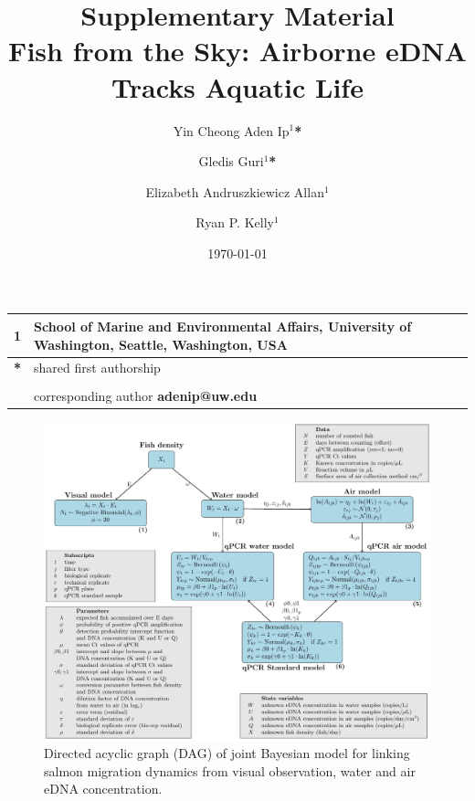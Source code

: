 \documentclass{article}
\title{Supplementary Material \\ \large{Fish from the Sky: Airborne eDNA Tracks Aquatic Life}}
\author{Yin Cheong Aden Ip$^1$\textbf{*} \and
Gledis Guri$^1$\textbf{*} \and
Elizabeth Andruszkiewicz Allan$^1$ \and
Ryan P. Kelly$^1$}
\date{\today}
\begin{document}
\maketitle


\begin{center}
\begin{tabular}{ll}
1 & School of Marine and Environmental Affairs, University of Washington, Seattle, Washington, USA \\
\hline
\textbf{*} & shared first authorship\\
&\\
& corresponding author \textbf{adenip@uw.edu}
\end{tabular}
\end{center}


\clearpage
\begin{figure}[tbhp] 
\centering
\includegraphics[width=16.5cm]{Plots/DAG.pdf}  
\caption{Directed acyclic graph (DAG) of joint Bayesian model for linking salmon migration dynamics from visual observation, water and air eDNA concentration.}
\label{fig:DAG}
\end{figure}

\end{document}
